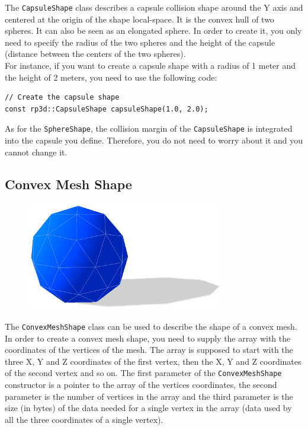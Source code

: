 \documentclass[a4paper,12pt]{article}
\begin{document}
    The \texttt{CapsuleShape} class describes a capsule collision shape around the Y axis and centered at the origin of the shape local-space. It is the convex hull of two
    spheres. It can also be seen as an elongated sphere. In order to create it, you only need to specify the radius of the two spheres and the height of the
    capsule (distance between the centers of the two spheres).  \\

    For instance, if you want to create a capsule shape with a radius of 1 meter and the height of 2 meters, you need to use the following code: \\

    \begin{lstlisting}
// Create the capsule shape
const rp3d::CapsuleShape capsuleShape(1.0, 2.0);
  \end{lstlisting}

    \vspace{0.6cm}

    As for the \texttt{SphereShape}, the collision margin of the \texttt{CapsuleShape} is integrated into the capsule you define.
    Therefore, you do not need to worry about it and you cannot change it.

    \subsection{Convex Mesh Shape}

    \begin{figure}[h]
        \centering
        \includegraphics{convexshape.png}
        \label{fig:convexshape}
    \end{figure}

    The \texttt{ConvexMeshShape} class can be used to describe the shape of a convex mesh. In order to create a convex mesh shape, you need to supply the array with the coordinates of
    the vertices of the mesh. The array is supposed to start with the three X, Y and Z coordinates of the first vertex, then the X, Y and Z coordinates of the second vertex and so on.
    The first parameter of the \texttt{ConvexMeshShape} constructor is a pointer to the array of the vertices coordinates, the second parameter is the number of vertices in the array and
    the third parameter is the size (in bytes) of the data needed for a single vertex in the array (data used by all the three coordinates of a single vertex). \\
\end{document}

